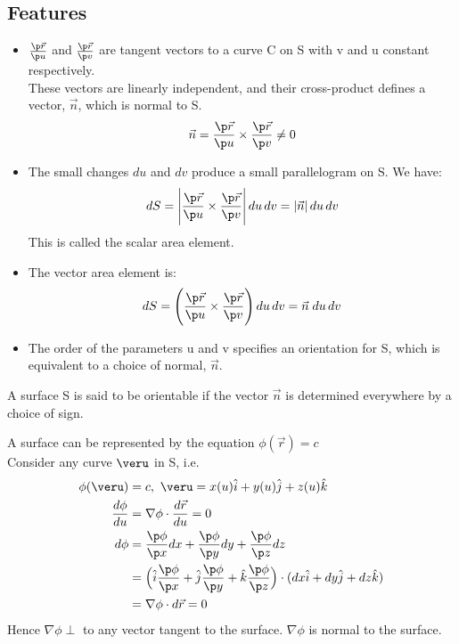 \documentclass[a4paper, 11pt, normalem]{report}
\begin{document}
\subsection{Features}
\begin{itemize}
    \item $\frac{\p \vec{r}}{\p u}$ and $\frac{\p \vec{r}}{\p v}$ are tangent vectors to a curve C on S with v and u constant respectively. \\
    These vectors are linearly independent, and their cross-product defines a vector, $\vec{n}$, which is normal to S.
            \begin{equation*}
                \vec{n} = \frac{\p \vec{r}}{\p u} \times \frac{\p \vec{r}}{\p v} \neq 0
            \end{equation*}
    \item The small changes $du$ and $dv$ produce a small parallelogram on S. We have:
            \begin{equation*}
                dS = \Bigg|\frac{\p \vec{r}}{\p u} \times \frac{\p \vec{r}}{\p v}\Bigg|\,du\,dv = |\vec{n}|\,du\,dv
            \end{equation*}
            This is called the scalar area element.
    \item The vector area element is:
            \begin{equation*}
                dS = \Bigg(\frac{\p \vec{r}}{\p u} \times \frac{\p \vec{r}}{\p v}\Bigg)\,du\,dv = \vec{n}\;du\,dv
            \end{equation*}
    \item The order of the parameters u and v specifies an orientation for S, which is equivalent to a choice of normal, $\vec{n}$.
\end{itemize}
A surface S is said to be orientable if the vector $\vec{n}$ is determined everywhere by a choice of sign.

A surface can be represented by the equation $\phi(\vec{r}) = c$ \\
Consider any curve $\veru$ in S, i.e.
\begin{align*}
    \phi(\veru) &= c, ~ \veru = x(u)\hat{i} + y(u)\hat{j} + z(u)\hat{k} \\
    \frac{d\phi}{du} &= \nabla\phi \cdot \frac{d\vec{r}}{du} = 0 \\
    d\phi &= \frac{\p \phi}{\p x}dx + \frac{\p\phi}{\p y}dy + \frac{\p\phi}{\p z}dz \\
    &= \Big(\hat{i}\frac{\p\phi}{\p x} + \hat{j}\frac{\p\phi}{\p y} + \hat{k}\frac{\p\phi}{\p z}\Big) \cdot (dx\hat{i} + dy\hat{j} + dz\hat{k}) \\
    &= \nabla\phi \cdot d\vec{r} = 0
\end{align*}
Hence $\nabla\phi \perp$ to any vector tangent to the surface. $\nabla\phi$ is normal to the surface.
\end{document}
